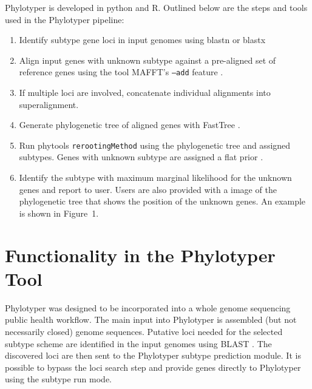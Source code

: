 \documentclass{bioinfo}
\begin{document}
Phylotyper is developed in python and R. 
Outlined below are the steps and tools used in the Phylotyper pipeline:

\begin{enumerate}
\item Identify subtype gene loci in input genomes using blastn or blastx %
\item Align input genes with unknown subtype against a pre-aligned set of reference genes using the tool MAFFT's \texttt{--add} feature \citep{Katoh2013}.
\item If multiple loci are involved, concatenate individual alignments into superalignment.
\item Generate phylogenetic tree of aligned genes with FastTree \citep{Price2010}.
\item Run phytools \texttt{rerootingMethod} using the phylogenetic tree and assigned subtypes. 
Genes with unknown subtype are assigned a flat prior \citep{Revell2011}.
\item Identify the subtype with maximum marginal likelihood for the unknown genes and report to user.
Users are also provided with a image of the phylogenetic tree that shows the position of the unknown genes. 
An example is shown in Figure~1\vphantom{\ref{fig:01}}.
\end{enumerate}


\section{Functionality in the Phylotyper Tool}

Phylotyper was designed to be incorporated into a whole genome sequencing public health workflow.  
The main input into Phylotyper is assembled (but not necessarily closed) genome sequences.  
Putative loci needed for the selected subtype scheme are identified in the input genomes using BLAST \citep{Camacho2009}.
The discovered loci are then sent to the Phylotyper subtype prediction module.
It is possible to bypass the loci search step and provide genes directly to Phylotyper using the subtype run mode.
\end{document}
